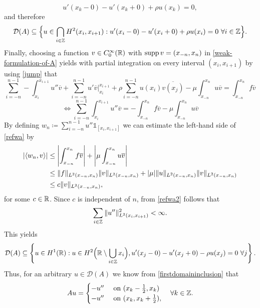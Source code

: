 	\begin{equation}
		u'(x_{k}-0) - u'(x_{k}+0) + \rho u(x_{k}) = 0, \label{jump}
	\end{equation} 
and therefore
	\begin{equation}
		\mathcal{D}(A) \subseteq \Big\{ u \in \bigcap_{i \in \mathbb{Z}} H^{2}(x_{i}, x_{i+1}) : u'(x_{i} - 0) - u'(x_{i} + 0) + \rho u(x_{i}) = 0 ~\forall i \in \mathbb{Z} \Big\}.
	\end{equation} 
Finally, choosing a function $v \in C_{0}^{\infty}(\mathbb{R})$ with $\operatorname{supp} v = (x_{-n}, x_{n})$ in \eqref{weak-formulation-of-A} yields with partial integration on every interval $(x_{i}, x_{i+1})$ by using \eqref{jump} that
\[ \sum_{i=-n}^{n-1} -\int_{x_{i}}^{x_{i+1}} u'' \overline{v} + \sum_{i=-n}^{n-1} u' \overline{v} \Big|_{x_{i}}^{x_{i+1}} + \rho \sum_{i=-n}^{n-1} u(x_{i}) \overline{v(x_{j})} - \mu \int_{x_{-n}}^{x_{n}} u \overline{v} = \int_{x_{-n}}^{x_{n}} f \overline{v} \]
\begin{equation} %
	\iff \sum_{i=-n}^{n-1} \int_{x_{i}}^{x_{i+1}} u'' \overline{v} = - \int_{x_{-n}}^{x_{n}} f \overline{v} - \mu \int_{x_{-n}}^{x_{n}} u \overline{v} \label{refwa}
\end{equation} 
By defining $w_{n} \coloneqq \sum_{i=-n}^{n-1} u'' \mathds{1}_{[x_{i}, x_{i+1}]}$ we can estimate the left-hand side of \eqref{refwa} by
\begin{align}
	\left| \langle w_{n}, v \rangle \right| & \leq \left| \int_{x_{-n}}^{x_{n}} f \overline{v} \right| + \left| \mu \int_{x_{-n}}^{x_{n}} u \overline{v} \right|  \notag \\
		& \leq \|f\|_{L^{2}(x_{-n}, x_{n})} \|v\|_{L^{2}(x_{-n}, x_{n})} + |\mu| \|u\|_{L^{2}(x_{-n}, x_{n})} \|v\|_{L^{2}(x_{-n}, x_{n})} \notag \\
		& \leq c \|v\|_{L^{2}(x_{-n}, x_{n})}, \label{refwa2}
\end{align}
for some $c \in \mathbb{R}$. Since $c$ is independent of $n$, from \eqref{refwa2} follows that
	\[ \sum_{i \in \mathbb{Z}} \|u''\|^{2}_{L^{2}(x_{i}, x_{i+1})} < \infty. \]
This yields
	\begin{equation}
		\mathcal{D}(A) \subseteq \left\{ u \in H^{1}(\mathbb{R}): u \in H^{2}\Big(\mathbb{R} \setminus \bigcup_{i \in \mathbb{Z}} x_{i} \Big), u'(x_{j} - 0) - u'(x_{j} + 0) - \rho u(x_{j}) = 0 ~\forall j \right\}. \label{firstdomaininclusion} 
	\end{equation}
Thus, for an arbitrary $u \in \mathcal{D}(A)$ we know from \eqref{firstdomaininclusion} that
	\[ A u = \begin{cases}
					- u'' & \text{ on } (x_{k} - \frac{1}{2}, x_{k}) \\
					- u'' & \text{ on } (x_{k}, x_{k} + \frac{1}{2}),
			 \end{cases} \quad \forall k \in \mathbb{Z}. \]
